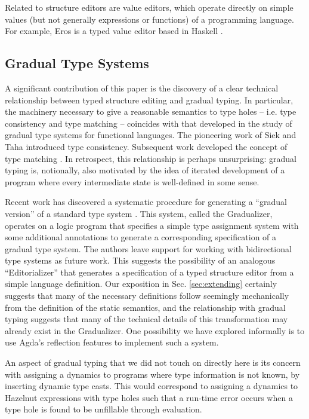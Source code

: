 \documentclass[preprint,9pt]{sigplanconf}
\begin{document}
Related to structure editors are value editors, which operate directly on
simple values (but not generally expressions or functions) of a programming
language. For example, Eros is a typed value editor based in
Haskell \cite{DBLP:conf/icfp/Elliott07}.


\subsection{Gradual Type Systems}
A significant contribution of this paper is the discovery of a clear
technical relationship between typed structure editing and gradual
typing. In particular, the machinery necessary to give a reasonable
semantics to type holes -- i.e. type consistency and type matching --
coincides with that developed in the study of gradual type systems for
functional languages. The pioneering work of Siek and Taha \cite{Siek06a}
introduced type consistency. Subsequent work developed the concept of type
matching \cite{DBLP:conf/popl/RastogiCH12,DBLP:conf/popl/GarciaC15}. In
retrospect, this relationship is perhaps unsurprising: gradual typing is,
notionally, also motivated by the idea of iterated development of a program
where every intermediate state is well-defined in some sense.

Recent work has discovered a systematic procedure for generating a
``gradual version'' of a standard type
system \cite{DBLP:conf/popl/CiminiS16}. This system, called the
Gradualizer, operates on a logic program that specifies a simple type
assignment system with some additional annotations to generate a
corresponding specification of a gradual type system. The authors leave
support for working with bidirectional type systems as future work. This
suggests the possibility of an analogous ``Editorializer'' that generates a
specification of a typed structure editor from a simple language
definition. Our exposition in Sec. \ref{sec:extending} certainly suggests
that many of the necessary definitions follow seemingly mechanically from
the definition of the static semantics, and the relationship with gradual
typing suggests that many of the technical details of this transformation
may already exist in the Gradualizer. One possibility we have explored
informally is to use Agda's reflection features to implement such a system.

An aspect of gradual typing that we did not touch on directly here is its
concern with assigning a dynamics to programs where type information is not
known, by inserting dynamic type casts. This would correspond to assigning
a dynamics to Hazelnut expressions with type holes such that a run-time
error occurs when a type hole is found to be unfillable through evaluation.
\end{document}
